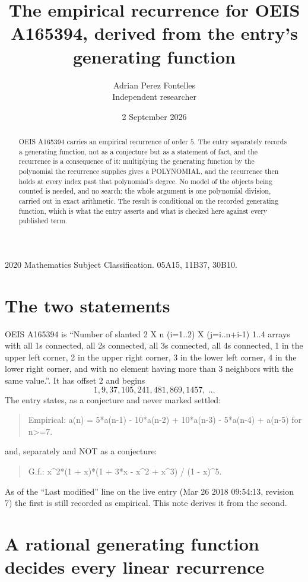 \documentclass[11pt,a4paper]{article}
\title{The empirical recurrence for OEIS A165394, derived from the entry's generating function}
\author{Adrian Perez Fontelles\\ \small Independent researcher}
\date{2 September 2026}
\theoremstyle{plain}
\theoremstyle{definition}
\begin{document}
\maketitle

\begin{abstract}
OEIS A165394 carries an empirical recurrence of order $5$. The entry separately records a
generating function, not as a conjecture but as a statement of fact, and the recurrence is a
consequence of it: multiplying the generating function by the polynomial the recurrence
supplies gives a POLYNOMIAL, and the recurrence then holds at every index past that
polynomial's degree. No model of the objects being counted is needed, and no search: the
whole argument is one polynomial division, carried out in exact arithmetic. The result is
conditional on the recorded generating function, which is what the entry asserts and what is
checked here against every published term.
\end{abstract}

\noindent\small 2020 Mathematics Subject Classification. 05A15, 11B37, 30B10.\normalsize

\section{The two statements}

OEIS A165394 is ``Number of slanted 2 X n (i=1..2) X (j=i..n+i-1) 1..4 arrays with all 1s connected, all 2s connected, all 3s connected, all 4s connected, 1 in the upper left corner, 2 in the upper right corner, 3 in the lower left corner, 4 in the lower right corner, and with no element having more than 3 neighbors with the same value.''. It has offset $2$ and begins
\[
1, 9, 37, 105, 241, 481, 869, 1457,\ \dots
\]
The entry states, as a conjecture and never marked settled:
\begin{quote}
Empirical: a(n) = 5*a(n-1) - 10*a(n-2) + 10*a(n-3) - 5*a(n-4) + a(n-5) for n>=7.
\end{quote}
and, separately and NOT as a conjecture:
\begin{quote}
G.f.: x\^{}2*(1 + x)*(1 + 3*x - x\^{}2 + x\^{}3) / (1 - x)\^{}5.
\end{quote}
As of the ``Last modified'' line on the live entry (Mar 26 2018 09:54:13, revision 7) the first is still
recorded as empirical. This note derives it from the second.

\section{A rational generating function decides every linear recurrence}
\end{document}

